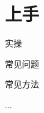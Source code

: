 \documentclass{beamer}
\begin{document}
\section{上手}

\begin{frame}{实操}
    
\item 常见问题

\item

\item 常见方法

\item

\item ... 

\end{frame}
\end{document}
